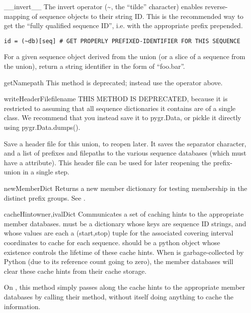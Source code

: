\documentclass{howto}
\begin{document}
\begin{funcdesc}{__invert__}{}
  The invert operator (\textasciitilde, the ``tilde'' character) 
  enables reverse-mapping of sequence objects to their string ID.
  This is the recommended way to get the ``fully qualified sequence ID'', i.e. with
  the appropriate prefix prepended. 
\begin{verbatim}
id = (~db)[seq] # GET PROPERLY PREFIXED-IDENTIFIER FOR THIS SEQUENCE
\end{verbatim}
  For a given sequence object  derived from the union
  (or a slice of a sequence from the union), return a string identifier
  in the form of ``foo.bar''.  
\end{funcdesc}

\begin{funcdesc}{getName}{path}
  This method is deprecated; instead use the  operator
  above.
\end{funcdesc}

\begin{funcdesc}{writeHeaderFile}{filename}
  THIS METHOD IS DEPRECATED, because it is restricted to
  assuming that all sequence dictionaries it contains
  are of a single class.  We recommend that you instead save
  it to pygr.Data, or pickle it directly using pygr.Data.dumps().

  Save a header file for this union, to reopen later.
  It saves the separator character, and a list of prefixes
  and filepaths to the various sequence databases (which
  must have a  attribute).  This header
  file can be used for later reopening the prefix-union
  in a single step.
\end{funcdesc}

\begin{funcdesc}{newMemberDict}{}
  Returns a new member dictionary for testing membership in
  the distinct prefix groups.  See .
\end{funcdesc}

\begin{funcdesc}{cacheHint}{owner,ivalDict}
  Communicates a set of caching hints to the appropriate member
  databases.   must be a dictionary whose keys are
  sequence ID strings, and whose values are each a (start,stop) tuple
  for the associated covering interval coordinates to
  cache for each sequence.   should be a python object
  whose existence controls the lifetime of these cache hints.
  When  is garbage-collected by Python (due to its 
  reference count going to zero), the member databases will clear
  these cache hints from their cache storage.

  On , this method simply passes along
  the cache hints to the appropriate member databases by calling
  their  method, without itself doing anything
  to cache the information.
\end{funcdesc}
\end{document}
